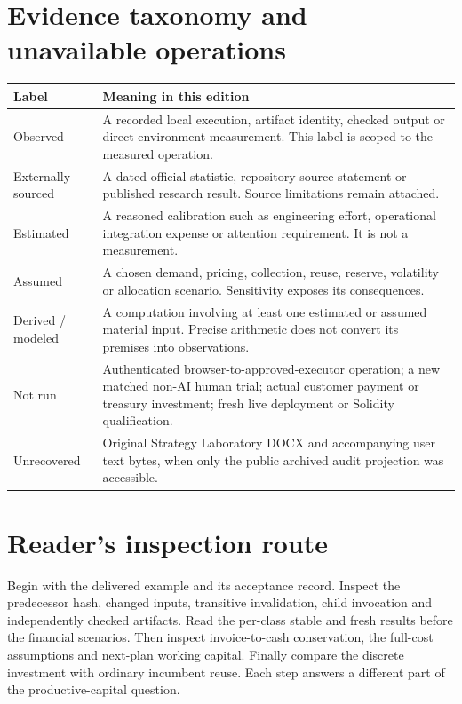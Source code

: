 \documentclass[11pt,a4paper]{article}
\begin{document}
\section{Evidence taxonomy and unavailable operations}
\begin{longtable}{p{.19\linewidth}p{.75\linewidth}}
\toprule Label & Meaning in this edition \\\midrule\endhead
Observed & A recorded local execution, artifact identity, checked output or direct environment measurement. This label is scoped to the measured operation. \\
Externally sourced & A dated official statistic, repository source statement or published research result. Source limitations remain attached. \\
Estimated & A reasoned calibration such as engineering effort, operational integration expense or attention requirement. It is not a measurement. \\
Assumed & A chosen demand, pricing, collection, reuse, reserve, volatility or allocation scenario. Sensitivity exposes its consequences. \\
Derived / modeled & A computation involving at least one estimated or assumed material input. Precise arithmetic does not convert its premises into observations. \\
Not run & Authenticated browser-to-approved-executor operation; a new matched non-AI human trial; actual customer payment or treasury investment; fresh live deployment or Solidity qualification. \\
Unrecovered & Original Strategy Laboratory DOCX and accompanying user text bytes, when only the public archived audit projection was accessible. \\\bottomrule
\end{longtable}
\section{Reader's inspection route}
Begin with the delivered example and its acceptance record. Inspect the predecessor hash, changed inputs, transitive invalidation, child invocation and independently checked artifacts. Read the per-class stable and fresh results before the financial scenarios. Then inspect invoice-to-cash conservation, the full-cost assumptions and next-plan working capital. Finally compare the discrete investment with ordinary incumbent reuse. Each step answers a different part of the productive-capital question.
\end{document}

